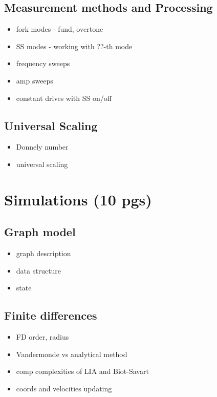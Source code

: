 \documentclass[a4paper, 12pt]{report}
\newcommand{\<}{\langle} %
\renewcommand{\>}{\rangle} %
\begin{document}
\section{Measurement methods and Processing}
\begin{itemize}
	\item fork modes - fund, overtone
	\item SS modes - working with ??-th mode
	\item frequency sweeps
	\item amp sweeps
	\item constant drives with SS on/off
\end{itemize}

\section{Universal Scaling}
\begin{itemize}
	\item Donnely number
	\item universal scaling
\end{itemize}

\newpage

\chapter{Simulations (10 pgs)}

\section{Graph model}
\begin{itemize}
	\item graph description
	\item data structure
	\item state
\end{itemize}

\section{Finite differences}
\begin{itemize}
	\item FD order, radius
	\item Vandermonde vs analytical method
	\item comp complexities of LIA and Biot-Savart
	\item coords and velocities updating
\end{itemize}
\end{document}
